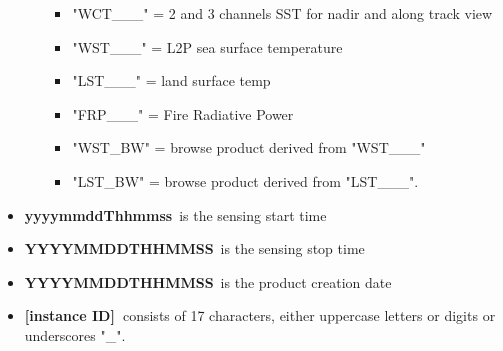 \documentclass[sigplan,screen]{acmart}
\begin{document}
\begin{itemize}
\begin{itemize}
    \begin{itemize}
    \item
      "WCT\_\_\_" = 2 and 3 channels SST for nadir and along track view
    \item
      "WST\_\_\_" = L2P sea surface temperature
    \item
      "LST\_\_\_" = land surface temp
    \item
      "FRP\_\_\_" = Fire Radiative Power
    \item
      "WST\_BW" = browse product derived from "WST\_\_\_"
    \item
      "LST\_BW" = browse product derived from "LST\_\_\_".
    \end{itemize}
  \end{itemize}
\item
  \textbf{yyyymmddThhmmss}~is the sensing start time
\item
  \textbf{YYYYMMDDTHHMMSS}~is the sensing stop time
\item
  \textbf{YYYYMMDDTHHMMSS}~is the product creation date
\item
  \textbf{{[}instance ID{]}~}consists of 17 characters, either uppercase
  letters or digits or underscores "\_".
\end{itemize}
\end{document}
